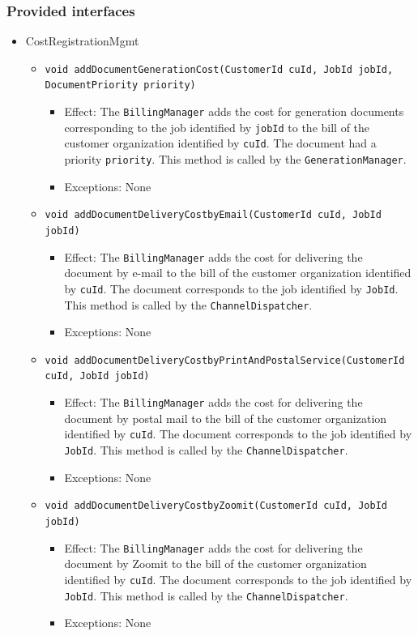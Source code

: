 \documentclass[a4paper,10pt]{article}
\begin{document}
\subsubsection*{Provided interfaces}
\begin{itemize}
    \item CostRegistrationMgmt
    \begin{itemize}
        \item \texttt{void addDocumentGenerationCost(CustomerId cuId, JobId jobId, DocumentPriority priority)}
        \begin{itemize}
            \item Effect: The \texttt{BillingManager} adds the cost for generation documents corresponding to the job identified by \texttt{jobId} to the bill of the customer organization identified by \texttt{cuId}. The document had a priority \texttt{priority}. This method is called by the \texttt{GenerationManager}.
            \item Exceptions: None
        \end{itemize}
        
		\item \texttt{void addDocumentDeliveryCostbyEmail(CustomerId cuId, JobId jobId)}       
        \begin{itemize}
            \item Effect: The \texttt{BillingManager} adds the cost for delivering the document by e-mail to the bill of the customer organization identified by \texttt{cuId}. The document corresponds to the job identified by \texttt{JobId}. This method is called by the \texttt{ChannelDispatcher}.
            \item Exceptions: None
        \end{itemize} 

		\item \texttt{void addDocumentDeliveryCostbyPrintAndPostalService(CustomerId cuId, JobId jobId)}       
        \begin{itemize}
            \item Effect: The \texttt{BillingManager} adds the cost for delivering the document by postal mail to the bill of the customer organization identified by \texttt{cuId}. The document corresponds to the job identified by \texttt{JobId}. This method is called by the \texttt{ChannelDispatcher}.
            \item Exceptions: None
        \end{itemize} 
        
		\item \texttt{void addDocumentDeliveryCostbyZoomit(CustomerId cuId, JobId jobId)}       
        \begin{itemize}
            \item Effect: The \texttt{BillingManager} adds the cost for delivering the document by Zoomit to the bill of the customer organization identified by \texttt{cuId}. The document corresponds to the job identified by \texttt{JobId}. This method is called by the \texttt{ChannelDispatcher}.
            \item Exceptions: None
        \end{itemize}   
        

\end{itemize}
\end{itemize}
\end{document}
